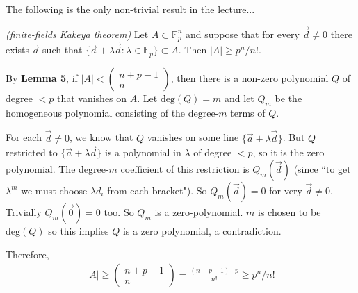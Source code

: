 \documentclass[12pt,a4paper]{report}
\newenvironment{proof}
{\begin{changemargin}{1cm}{0.5cm}
	}%
	{\end{changemargin}
}
\begin{document}
The following is the only non-trivial result in the lecture...
\s

 \emph{(finite-fields Kakeya theorem)} Let $A\subset \mathbb{F}_p^n$ and suppose that for every $\vec{d} \neq 0$ there exists $\vec{a}$ such that $\{ \vec{a} + \lambda \vec{d} : \lambda \in \mathbb{F}_p \} \subset A $. Then $|A| \geq p^n / n!$.
\begin{proof}
\pf By \textbf{Lemma 5}, if $|A| < \begin{pmatrix}
n+p-1 \\
n
\end{pmatrix}$, then there is a non-zero polynomial $Q$ of degree $<p$ that vanishes on $A$. Let $\text{deg}(Q) =m$ and let $Q_m$ be the homogeneous polynomial consisting of the degree-$m$ terms of $Q$.

\quad For each $\vec{d} \neq 0$, we know that $Q$ vanishes on some line $\{ \vec{a} + \lambda \vec{d} \}$. But $Q$ restricted to $\{ \vec{a} + \lambda \vec{d} \}$ is a polynomial in $\lambda$ of degree $<p$, so it is the zero polynomial. The degree-$m$ coefficient of this restriction is $Q_m(\vec{d})$ (since ``to get $\lambda^m$ we must choose $\lambda d_i$ from each bracket"). So $Q_m(\vec{d}) =0$ for very $\vec{d} \neq 0$. Trivially $Q_m(\vec{0}) =0$ too. So $Q_m$ is a zero-polynomial. $m$ is chosen to be $\text{deg}(Q)$ so this implies $Q$ is a zero polynomial, a contradiction.

\quad Therefore, 
\begin{align*}
|A| \geq \begin{pmatrix}
n+p-1 \\
n
\end{pmatrix} = \frac{(n+p-1)\cdots p}{n!} \geq p^n /n!
\end{align*}

\eop
\end{proof}
\end{document}
